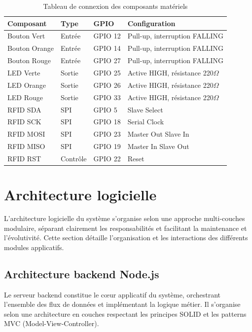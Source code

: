 \begin{table}[htbp]
\centering
\small
\caption{Tableau de connexion des composants matériels}
\label{tab:hardware_connections}
\begin{tabular}{|p{3.5cm}|p{2.5cm}|p{2cm}|p{4.5cm}|}
\hline
\rowcolor{sewesblu!20}
\textbf{Composant} & \textbf{Type} & \textbf{GPIO} & \textbf{Configuration} \\
\hline
Bouton Vert & Entrée & GPIO 12 & Pull-up, interruption FALLING \\
\hline
Bouton Orange & Entrée & GPIO 14 & Pull-up, interruption FALLING \\
\hline
Bouton Rouge & Entrée & GPIO 27 & Pull-up, interruption FALLING \\
\hline
LED Verte & Sortie & GPIO 25 & Active HIGH, résistance 220$\Omega$ \\
\hline
LED Orange & Sortie & GPIO 26 & Active HIGH, résistance 220$\Omega$ \\
\hline
LED Rouge & Sortie & GPIO 33 & Active HIGH, résistance 220$\Omega$ \\
\hline
RFID SDA & SPI & GPIO 5 & Slave Select \\
\hline
RFID SCK & SPI & GPIO 18 & Serial Clock \\
\hline
RFID MOSI & SPI & GPIO 23 & Master Out Slave In \\
\hline
RFID MISO & SPI & GPIO 19 & Master In Slave Out \\
\hline
RFID RST & Contrôle & GPIO 22 & Reset \\
\hline
\end{tabular}
\end{table}


\section{Architecture logicielle}

L'architecture logicielle du système s'organise selon une approche multi-couches modulaire, séparant clairement les responsabilités et facilitant la maintenance et l'évolutivité. Cette section détaille l'organisation et les interactions des différents modules applicatifs.

\subsection{Architecture backend Node.js}

Le serveur backend constitue le c\oe{}ur applicatif du système, orchestrant l'ensemble des flux de données et implémentant la logique métier. Il s'organise selon une architecture en couches respectant les principes SOLID et les patterns MVC (Model-View-Controller).

